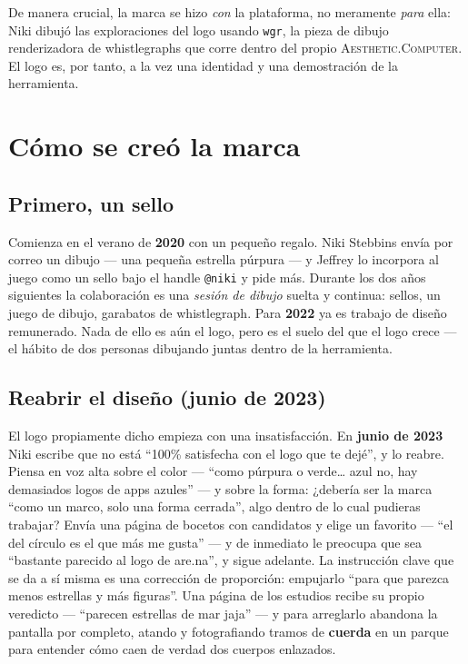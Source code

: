 \documentclass[10pt,letterpaper,twocolumn]{article}
\newcommand{\ac}{\textsc{Aesthetic}{\color{acpink}.}\textsc{Computer}}
\begin{document}
De manera crucial, la marca se hizo \emph{con} la plataforma, no meramente
\emph{para} ella: Niki dibujó las exploraciones del logo usando \texttt{wgr},
la pieza de dibujo renderizadora de whistlegraphs que corre dentro del propio
\ac{}. El logo es, por tanto, a la vez una identidad y una demostración de la
herramienta.

\section{Cómo se creó la marca}

\subsection{Primero, un sello}
Comienza en el verano de \textbf{2020} con un pequeño regalo. Niki Stebbins
envía por correo un dibujo --- una pequeña estrella púrpura --- y Jeffrey lo
incorpora al juego como un sello bajo el handle \texttt{@niki} y pide más.
Durante los dos años siguientes la colaboración es una \emph{sesión de dibujo}
suelta y continua: sellos, un juego de dibujo, garabatos de whistlegraph.
Para \textbf{2022} ya es trabajo de diseño remunerado. Nada de ello es aún el
logo, pero es el suelo del que el logo crece --- el hábito de dos personas
dibujando juntas dentro de la herramienta.

\subsection{Reabrir el diseño (junio de 2023)}
El logo propiamente dicho empieza con una insatisfacción. En \textbf{junio de
2023} Niki escribe que no está ``100\% satisfecha con el logo que te dejé'', y
lo reabre. Piensa en voz alta sobre el color --- ``como púrpura o
verde\dots{} azul no, hay demasiados logos de apps azules'' --- y sobre la
forma: ¿debería ser la marca ``como un marco, solo una forma cerrada'', algo
dentro de lo cual pudieras trabajar? Envía una página de bocetos con
candidatos y elige un favorito --- ``el del círculo es el que más me gusta''
--- y de inmediato le preocupa que sea ``bastante parecido al logo de
are.na'', y sigue adelante. La instrucción clave que se da a sí misma es una
corrección de proporción: empujarlo ``para que parezca menos estrellas y más
figuras''. Una página de los estudios recibe su propio veredicto --- ``parecen
estrellas de mar jaja'' --- y para arreglarlo abandona la pantalla por
completo, atando y fotografiando tramos de \textbf{cuerda} en un parque para
entender cómo caen de verdad dos cuerpos enlazados.
\end{document}
